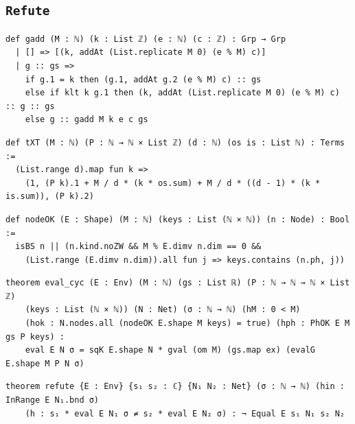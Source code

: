 \subsection{\texttt{Refute}}
\begin{lstlisting}[style=leancore]
def gadd (M : ℕ) (k : List ℤ) (e : ℕ) (c : ℤ) : Grp → Grp
  | [] => [(k, addAt (List.replicate M 0) (e % M) c)]
  | g :: gs =>
    if g.1 = k then (g.1, addAt g.2 (e % M) c) :: gs
    else if klt k g.1 then (k, addAt (List.replicate M 0) (e % M) c) :: g :: gs
    else g :: gadd M k e c gs
\end{lstlisting}
\begin{lstlisting}[style=leancore]
def tXT (M : ℕ) (P : ℕ → ℕ × List ℤ) (d : ℕ) (os is : List ℕ) : Terms :=
  (List.range d).map fun k =>
    (1, (P k).1 + M / d * (k * os.sum) + M / d * ((d - 1) * (k * is.sum)), (P k).2)
\end{lstlisting}
\begin{lstlisting}[style=leancore]
def nodeOK (E : Shape) (M : ℕ) (keys : List (ℕ × ℕ)) (n : Node) : Bool :=
  isBS n || (n.kind.noZW && M % E.dimv n.dim == 0 &&
    (List.range (E.dimv n.dim)).all fun j => keys.contains (n.ph, j))
\end{lstlisting}
\begin{lstlisting}[style=leancore]
theorem eval_cyc (E : Env) (M : ℕ) (gs : List ℝ) (P : ℕ → ℕ → ℕ × List ℤ)
    (keys : List (ℕ × ℕ)) (N : Net) (σ : ℕ → ℕ) (hM : 0 < M)
    (hok : N.nodes.all (nodeOK E.shape M keys) = true) (hph : PhOK E M gs P keys) :
    eval E N σ = sqK E.shape N * gval (om M) (gs.map ex) (evalG E.shape M P N σ)
\end{lstlisting}
\begin{lstlisting}[style=leancore]
theorem refute {E : Env} {s₁ s₂ : ℂ} {N₁ N₂ : Net} (σ : ℕ → ℕ) (hin : InRange E N₁.bnd σ)
    (h : s₁ * eval E N₁ σ ≠ s₂ * eval E N₂ σ) : ¬ Equal E s₁ N₁ s₂ N₂
\end{lstlisting}

